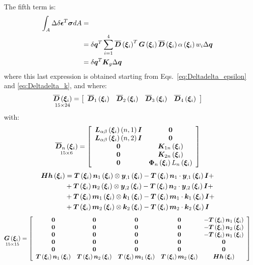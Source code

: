 The fifth term is:
\begin{equation}
\begin{split}
\int_A \Delta \delta { \T{\epsilon} }^T \T{\sigma} dA & = \\
& = \delta{\T{q}}^T  \sum_{i=1}^{4} \overline{\T{D}}\valxii^T  \T{G}\valxii  \overline{\T{D}}\valxii  \alpha \valxii  w_i \Delta \T{q} \\
& = \delta{\T{q}}^T  \T{K}_g  \Delta \T{q}
\end{split}
\end{equation}
where this last expression is obtained starting from Eqs.~\ref{eq:Deltadelta_epsilon} and \ref{eq:Deltadelta_k}, and where:
\begin{equation}
\underset{ 15 \times 24 }{\overline{\T{D}} \valxii} =
\sqbr{ \matr{ c c c c  }{
\overline{\T{D}}_1 \valxii & \overline{\T{D}}_2 \valxii & \overline{\T{D}}_3 \valxii & \overline{\T{D}}_4 \valxii
}}
\end{equation}
with:
\begin{equation}
\underset{ 15 \times 6 }{\overline{\T{D}}_n \valxii} =
\sqbr{ \matr{ c c  }{
\T{L}_{\alpha \beta} \valxii \plbr{n,1} \T{I} & \T{0} \\
\T{L}_{\alpha \beta} \valxii \plbr{n,2} \T{I} & \T{0} \\
\T{0} & \T{K}_{1n} \valxii\\
\T{0} & \T{K}_{2n} \valxii \\
\T{0} & \T{\Phi}_{n} \valxii L_{n} \valxii \\
}}
\end{equation}
\begin{equation}
\begin{split}
\T{Hh} \valxii & =
\T{T} \valxii \T{n}_1 \valxii \otimes \T{y}_{,1} \valxii - \T{T} \valxii \T{n}_1 \cdot \T{y}_{,1} \valxii \T{I} + \\
& + \T{T} \valxii \T{n}_2 \valxii \otimes \T{y}_{,2} \valxii - \T{T} \valxii \T{n}_2 \cdot \T{y}_{,2} \valxii \T{I} + \\
& + \T{T} \valxii \T{m}_1 \valxii \otimes \T{k}_{1} \valxii - \T{T} \valxii \T{m}_1 \cdot \T{k}_{1} \valxii \T{I} + \\
& + \T{T} \valxii \T{m}_2 \valxii \otimes \T{k}_{2} \valxii - \T{T} \valxii \T{m}_2 \cdot \T{k}_{2} \valxii \T{I}
\end{split}
\end{equation}
\begin{equation}
\underset{ 15 \times 15 }{ \T{G} \valxii } =
\sqbr{ \matr{ c c c c c}{
\T{0} & \T{0} & \T{0} & \T{0} & -\T{T} \valxii \T{n}_1 \valxii \\
\T{0} & \T{0} & \T{0} & \T{0} & -\T{T} \valxii \T{n}_2 \valxii \\
\T{0} & \T{0} & \T{0} & \T{0} & -\T{T} \valxii \T{n}_1 \valxii \\
\T{0} & \T{0} & \T{0} & \T{0} &  \T{0} \\
\T{0} & \T{0} & \T{0} & \T{0} &  \T{0} \\
\T{T} \valxii \T{n}_1 \valxii & \T{T} \valxii \T{n}_2 \valxii & \T{T} \valxii \T{m}_1 \valxii &  \T{T} \valxii \T{m}_2 \valxii & \T{Hh} \valxii
}}
\end{equation}
